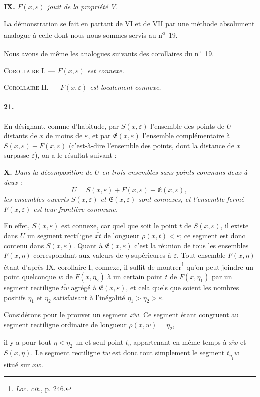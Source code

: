 \documentclass[a4paper,12pt]{amsart}
\newcommand{\srcpage}[1]{} %
\begin{document}
\srcpage{85}
\textbf{IX.} \textit{$F(x,\varepsilon)$ jouit de la propriété V.}

La démonstration se fait en partant de VI et de VII par une méthode absolument analogue à celle dont nous nous sommes servis au n\textsuperscript{o}~19.

Nous avons de même les analogues suivants des corollaires du n\textsuperscript{o}~19.

\textsc{Corollaire I.} --- \textit{$F(x,\varepsilon)$ est connexe.}

\textsc{Corollaire II.} --- \textit{$F(x,\varepsilon)$ est localement connexe.}

\paragraph{21.}
En désignant, comme d'habitude, par $S(x,\varepsilon)$ l'ensemble des points de $U$ distants de $x$ de moins de $\varepsilon$, et par $\mathfrak{E}(x,\varepsilon)$ l'ensemble complémentaire à $S(x,\varepsilon)+F(x,\varepsilon)$ (c'est-à-dire l'ensemble des points, dont la distance de $x$ surpasse $\varepsilon$), on a le résultat suivant :

\textbf{X.} \textit{Dans la décomposition de $U$ en trois ensembles sans points communs deux à deux :}
\[U=S(x,\varepsilon)+F(x,\varepsilon)+\mathfrak{E}(x,\varepsilon),\]
\textit{les ensembles ouverts $S(x,\varepsilon)$ et $\mathfrak{E}(x,\varepsilon)$ sont connexes, et l'ensemble fermé $F(x,\varepsilon)$ est leur frontière commune.}

En effet, $S(x,\varepsilon)$ est connexe, car quel que soit le point $t$ de $S(x,\varepsilon)$, il existe dans $U$ un segment rectiligne $\overline{xt}$ de longueur $\rho(x,t)<\varepsilon$; ce segment est donc contenu dans $S(x,\varepsilon)$. Quant à $\mathfrak{E}(x,\varepsilon)$ c'est la réunion de tous les ensembles $F(x,\eta)$ correspondant aux valeurs de $\eta$ supérieures à $\varepsilon$. Tout ensemble $F(x,\eta)$ étant d'après IX, corollaire I, connexe, il suffit de montrer\footnote{\textit{Loc. cit.}, p. 246.} qu'on peut joindre un point quelconque $w$ de $F(x,\eta_2)$ à un certain point $t$ de $F(x,\eta_1)$ par un segment rectiligne $\overline{tw}$ agrégé à $\mathfrak{E}(x,\varepsilon)$, et cela quels que soient les nombres positifs $\eta_1$ et $\eta_2$ satisfaisant à l'inégalité $\eta_1>\eta_2>\varepsilon$.

Considérons pour le prouver un segment $\overline{xw}$. Ce segment étant congruent au segment rectiligne ordinaire de longueur $\rho(x,w)=\eta_2$,
\srcpage{86}
il y a pour tout $\eta<\eta_2$ un et seul point $t_\eta$ appartenant en même temps à $\overline{xw}$ et $S(x,\eta)$. Le segment rectiligne $\overline{tw}$ est donc tout simplement le segment $\overline{t_{\eta_1}w}$ situé sur $\overline{xw}$.
\end{document}
